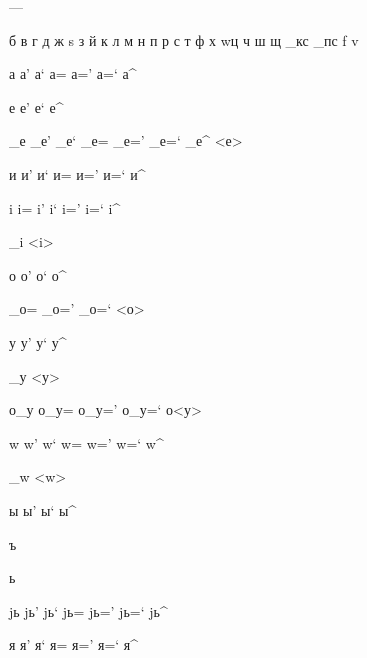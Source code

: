 \documentclass{article}
\begin{document}
\huge
---


б в г д ж s з й к л м н п р с т ф х w\т ц ч ш щ _кс _пс f v

а а' а` а= а=' а=` а^

е е' е` е^

_е _е' _е` _е= _е=' _е=` _е^ <е>

и и' и` и= и=' и=` и^

i i= i' i` i=' i=` i^ 

_i <i>

о о' о` о^

_о= _о=' _о=` <о>

у у' у` у^

_у <у>

о_у о_у= о_у=' о_у=` о<у>

w w' w` w= w=' w=` w^

_w <w>

ы ы' ы` ы^

ъ

ь

jь jь' jь` jь= jь=' jь=` jь^

я я' я` я= я=' я=` я^
\end{document}
